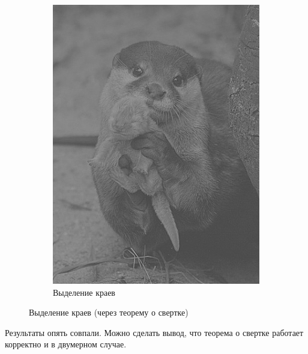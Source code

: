 \begin{figure}[ht!]
\begin{subfigure}[b]{0.5\linewidth}
        \includegraphics[width=0.95\linewidth]{edge_x.png}
        \caption{Выделение краев}
    \end{subfigure}
    \caption{Выделение краев (через теорему о свертке)}
    \label{img:edge2}
\end{figure}

Результаты опять совпали. Можно сделать вывод, что теорема о свертке работает корректно и в двумерном случае. 

\FloatBarrier